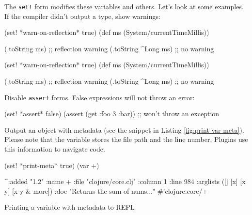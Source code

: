 The \verb|set!| form modifies these variables and others.
Let's look at some examples.
If the compiler didn't output a type, show warnings:

\ifx\DEVICETYPE\MOBILE

\begin{english}
  \begin{clojure}
(set! *warn-on-reflection* true)
(def ms (System/currentTimeMillis))

(.toString ms) ;; reflection warning
(.toString ^Long ms) ;; no warning
  \end{clojure}
\end{english}

\else

\begin{english}
  \begin{clojure}
(set! *warn-on-reflection* true)
(def ms (System/currentTimeMillis))

(.toString ms)       ;; reflection warning
(.toString ^Long ms) ;; no warning
  \end{clojure}
\end{english}

\fi

\noindent
Disable \verb|assert| forms.
False expressions will not throw an error:

\begin{english}
  \begin{clojure}
(set! *assert* false)
(assert (get {:foo 3} :bar))
;; won't throw an exception
  \end{clojure}
\end{english}

\noindent
Output an object with metadata (see the snippet in Listing \ref{fig:print-var-meta}).
Please note that the variable stores the file path and the line number. Plugins use this information to navigate code.

\begin{listing}[ht!]

\begin{english}
  \begin{clojure}
(set! *print-meta* true)
(var +)

^{:added "1.2"
  :name +
  :file "clojure/core.clj"
  :column 1
  :line 984
  :arglists ([] [x] [x y] [x y & more])
  :doc "Returns the sum of nums..."}
#'clojure.core/+
  \end{clojure}
\end{english}

\caption{Printing a variable with metadata to REPL}
\label{fig:print-var-meta}

\end{listing}

